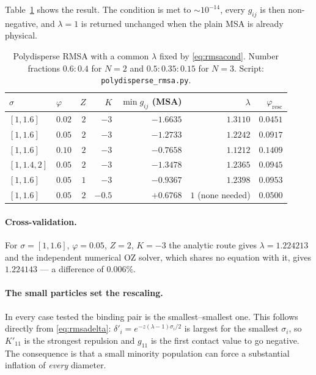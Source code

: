 \documentclass[11pt,a4paper]{article}
\newcommand{\code}[1]{\texttt{#1}}
\begin{document}
Table~\ref{tab:rmsapoly} shows the result. The condition is met to
$\sim10^{-14}$, every $g_{ij}$ is then non-negative, and $\lambda=1$ is
returned unchanged when the plain MSA is already physical.

\begin{table}[htbp]
\centering\small
\caption{Polydisperse RMSA with a common $\lambda$ fixed by
\eqref{eq:rmsacond}. Number fractions $0.6:0.4$ for $N=2$ and
$0.5:0.35:0.15$ for $N=3$. Script: \code{polydisperse\_rmsa.py}.}
\label{tab:rmsapoly}
\begin{tabular}{@{}llrrrrr@{}}
\toprule
$\sigma$ & $\varphi$ & $Z$ & $K$ & $\min g_{ij}$ (MSA) & $\lambda$ & $\varphi_{\mathrm{resc}}$\\
\midrule
$[1,1.6]$ & $0.02$ & $2$ & $-3$ & $-1.6635$ & $1.3110$ & $0.0451$\\
$[1,1.6]$ & $0.05$ & $2$ & $-3$ & $-1.2733$ & $1.2242$ & $0.0917$\\
$[1,1.6]$ & $0.10$ & $2$ & $-3$ & $-0.7658$ & $1.1212$ & $0.1409$\\
$[1,1.4,2]$ & $0.05$ & $2$ & $-3$ & $-1.3478$ & $1.2365$ & $0.0945$\\
$[1,1.6]$ & $0.05$ & $1$ & $-3$ & $-0.9367$ & $1.2398$ & $0.0953$\\
$[1,1.6]$ & $0.05$ & $2$ & $-0.5$ & $+0.6768$ & $1$ (none needed) & $0.0500$\\
\bottomrule
\end{tabular}
\end{table}

\paragraph{Cross-validation.} For $\sigma=[1,1.6]$, $\varphi=0.05$, $Z=2$,
$K=-3$ the analytic route gives $\lambda=1.224213$ and the independent
numerical OZ solver, which shares no equation with it, gives $1.224143$ --- a
difference of $0.006\%$.

\paragraph{The small particles set the rescaling.} In every case tested the
binding pair is the smallest--smallest one. This follows directly from
\eqref{eq:rmsadelta}: $\delta'_i=e^{-z(\lambda-1)\sigma_i/2}$ is largest for
the smallest $\sigma_i$, so $K'_{11}$ is the strongest repulsion and $g_{11}$
is the first contact value to go negative. The consequence is that a small
minority population can force a substantial inflation of \emph{every} diameter.
\end{document}
